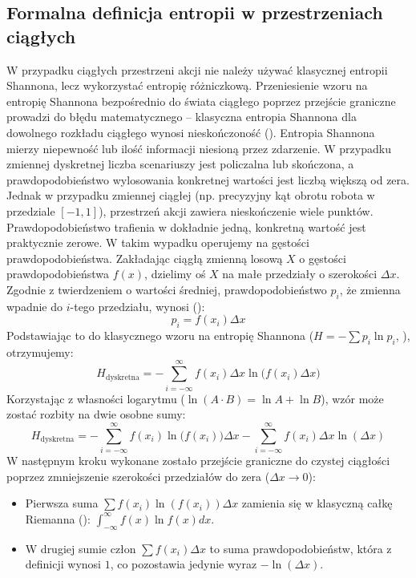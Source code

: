 \documentclass[12pt,twoside]{article}
\begin{document}
\subsection{Formalna definicja entropii w przestrzeniach ciągłych}
W przypadku ciągłych przestrzeni akcji nie należy używać klasycznej entropii Shannona, lecz wykorzystać entropię różniczkową. Przeniesienie wzoru na entropię Shannona bezpośrednio do świata ciągłego poprzez przejście graniczne prowadzi do błędu matematycznego -- klasyczna entropia Shannona dla dowolnego rozkładu ciągłego wynosi nieskończoność (\cite{str6}).
\newline
Entropia Shannona mierzy niepewność lub ilość informacji niesioną przez zdarzenie. W przypadku zmiennej dyskretnej liczba scenariuszy jest policzalna lub skończona, a prawdopodobieństwo wylosowania konkretnej wartości jest liczbą większą od zera. Jednak w przypadku zmiennej ciągłej (np. precyzyjny kąt obrotu robota w przedziale $[-1, 1]$), przestrzeń akcji zawiera nieskończenie wiele punktów. Prawdopodobieństwo trafienia w dokładnie jedną, konkretną wartość jest praktycznie zerowe. W takim wypadku operujemy na gęstości prawdopodobieństwa.
\newline
Zakładając ciągłą zmienną losową $X$ o gęstości prawdopodobieństwa $f(x)$, dzielimy oś $X$ na małe przedziały o szerokości $\Delta x$. Zgodnie z twierdzeniem o wartości średniej, prawdopodobieństwo $p_i$, że zmienna wpadnie do $i$-tego przedziału, wynosi (\cite{str7}):
\begin{equation}
p_i = f(x_i)\Delta x
\label{eq:prawdopodobienstwo_przedzialu}
\end{equation}
Podstawiając to do klasycznego wzoru na entropię Shannona ($H = -\sum p_i \ln p_i$, \cite{str7}), otrzymujemy:
\begin{equation}
H_{\text{dyskretna}} = -\sum_{i=-\infty}^{\infty} f(x_i) \Delta x \ln \big( f(x_i) \Delta x \big)
\label{eq:shannon_dyskretna_podstawienie}
\end{equation}
Korzystając z własności logarytmu ($\ln(A \cdot B) = \ln A + \ln B$), wzór może zostać rozbity na dwie osobne sumy:
\begin{equation}
H_{\text{dyskretna}} = -\sum_{i=-\infty}^{\infty} f(x_i) \ln \big(f(x_i)\big) \Delta x - \sum_{i=-\infty}^{\infty} f(x_i) \Delta x \ln(\Delta x)
\label{eq:shannon_rozbicie}
\end{equation}
W następnym kroku wykonane zostało przejście graniczne do czystej ciągłości poprzez zmniejszenie szerokości przedziałów do zera ($\Delta x \to 0$):
\begin{itemize}
    \item Pierwsza suma $\sum f(x_i) \ln(f(x_i)) \Delta x$ zamienia się w klasyczną całkę Riemanna (\cite{str8}): $\int_{-\infty}^{\infty} f(x) \ln f(x) dx$.
    \item W drugiej sumie człon $\sum f(x_i) \Delta x$ to suma prawdopodobieństw, która z definicji wynosi $1$, co pozostawia jedynie wyraz $-\ln(\Delta x)$.
\end{itemize}
\end{document}

